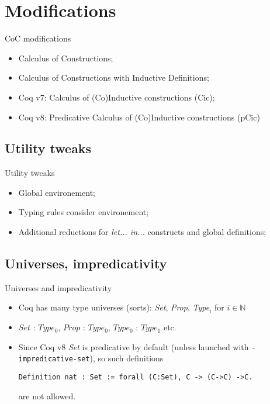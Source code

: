 \documentclass{beamer}
\begin{document}
\section{Modifications}
\begin{frame}{CoC modifications}
\begin{itemize}
\item Calculus of Constructions;
\item Calculus of Constructions with Inductive Definitions;
\item Coq v7: Calculus of (Co)Inductive constructions (Cic);
\item Coq v8: Predicative Calculus of (Co)Inductive constructions (pCic)
\end{itemize}
\end{frame}
\subsection{Utility tweaks}
\begin{frame}{Utility tweaks}
\begin{itemize}
\item Global environement;
\item Typing rules consider environement;
\item Additional reductions for \textit{let... in...} constructs and global definitions;
\end{itemize}
\end{frame}


\subsection{Universes, impredicativity}
\begin{frame}[fragile]{Universes and impredicativity}
\begin{itemize}
\item Coq has many type universes (sorts): \textit{Set}, \textit{Prop}, \textit{Type}$_i$ for $i \in \mathbb{N}$
\item $Set$ : $Type_0$, $Prop$ : $Type_0$, $Type_0$ : $Type_1$ etc.
\item Since Coq v8 \textit{Set} is predicative by default (unless launched with \texttt{-impredicative-set}), so such definitions

\begin{lstlisting} 
Definition nat : Set := forall (C:Set), C -> (C->C) ->C.
\end{lstlisting}

are not allowed.
\end{itemize}
\end{frame}
\end{document}
